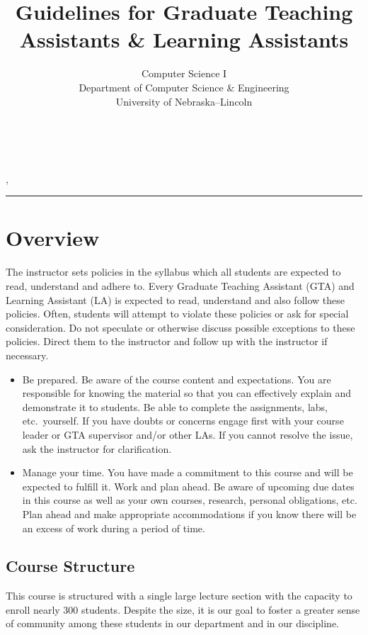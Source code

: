 \documentclass[12pt]{scrartcl}
\title{Guidelines for Graduate Teaching Assistants \& Learning Assistants}\let\Title\@title
\subtitle{Computer Science I\\
{\small
\vskip1cm
Department of Computer Science \& Engineering \\
University of Nebraska--Lincoln}
\vskip-1cm}
\date{~}
\begin{document}
\maketitle

\newwatermark[allpages=true,scale=5,textmark=Draft]{},

\hrule

\section*{Overview}

The instructor sets policies in the syllabus which all students 
are expected to read, understand and adhere to. Every Graduate 
Teaching Assistant (GTA) and Learning Assistant (LA) is expected 
to read, understand and also follow these policies.  Often, 
students will attempt to violate these policies or ask for special 
consideration.  Do not speculate or otherwise discuss possible 
exceptions to these policies.  Direct them to the instructor 
and follow up with the instructor if necessary.

\begin{itemize}
  \item Be prepared.  Be aware of the course content and expectations.
  You are responsible for knowing the material so that you can effectively
  explain and demonstrate it to students.  Be able to complete the assignments, 
  labs, etc.\ yourself.  If you have doubts or concerns engage first with
  your course leader or GTA supervisor and/or other LAs.  If you cannot
  resolve the issue, ask the instructor for clarification.
  \item Manage your time.  You have made a commitment to this course and
  will be expected to fulfill it.  Work and plan ahead.  Be aware of 
  upcoming due dates in this course as well as your own courses, research, 
  personal obligations, etc.  Plan ahead and make appropriate accommodations 
  if you know there will be an excess of work during a period of time.
\end{itemize}

\subsection*{Course Structure}

This course is structured with a single large lecture section with the
capacity to enroll nearly 300 students.  Despite the size, it is our 
goal to foster a greater sense of community among these students in 
our department and in our discipline.  
\end{document}
